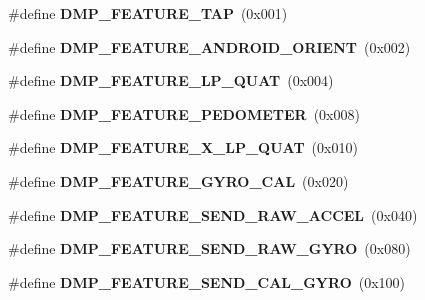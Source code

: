 \begin{DoxyCompactItemize}
\item 
\#define {\bfseries D\+M\+P\+\_\+\+F\+E\+A\+T\+U\+R\+E\+\_\+\+T\+AP}~(0x001)\hypertarget{group___d_r_i_v_e_r_s_ga87fac39cf95e2c56afdf507a986fa00b}{}\label{group___d_r_i_v_e_r_s_ga87fac39cf95e2c56afdf507a986fa00b}

\item 
\#define {\bfseries D\+M\+P\+\_\+\+F\+E\+A\+T\+U\+R\+E\+\_\+\+A\+N\+D\+R\+O\+I\+D\+\_\+\+O\+R\+I\+E\+NT}~(0x002)\hypertarget{group___d_r_i_v_e_r_s_gaf2b250fc928390d562f7bd80300ce419}{}\label{group___d_r_i_v_e_r_s_gaf2b250fc928390d562f7bd80300ce419}

\item 
\#define {\bfseries D\+M\+P\+\_\+\+F\+E\+A\+T\+U\+R\+E\+\_\+\+L\+P\+\_\+\+Q\+U\+AT}~(0x004)\hypertarget{group___d_r_i_v_e_r_s_gabf442c0477f8f7704a8094519ddfe38e}{}\label{group___d_r_i_v_e_r_s_gabf442c0477f8f7704a8094519ddfe38e}

\item 
\#define {\bfseries D\+M\+P\+\_\+\+F\+E\+A\+T\+U\+R\+E\+\_\+\+P\+E\+D\+O\+M\+E\+T\+ER}~(0x008)\hypertarget{group___d_r_i_v_e_r_s_gabcf6a5bc9703782d711d0c6ba92ade85}{}\label{group___d_r_i_v_e_r_s_gabcf6a5bc9703782d711d0c6ba92ade85}

\item 
\#define {\bfseries D\+M\+P\+\_\+\+F\+E\+A\+T\+U\+R\+E\+\_\+X\+\_\+\+L\+P\+\_\+\+Q\+U\+AT}~(0x010)\hypertarget{group___d_r_i_v_e_r_s_gae879a3c9729f9e1be5e6d7c9211c69c0}{}\label{group___d_r_i_v_e_r_s_gae879a3c9729f9e1be5e6d7c9211c69c0}

\item 
\#define {\bfseries D\+M\+P\+\_\+\+F\+E\+A\+T\+U\+R\+E\+\_\+\+G\+Y\+R\+O\+\_\+\+C\+AL}~(0x020)\hypertarget{group___d_r_i_v_e_r_s_gaaf0ac890c1f83106c08b722f1e865fdb}{}\label{group___d_r_i_v_e_r_s_gaaf0ac890c1f83106c08b722f1e865fdb}

\item 
\#define {\bfseries D\+M\+P\+\_\+\+F\+E\+A\+T\+U\+R\+E\+\_\+\+S\+E\+N\+D\+\_\+\+R\+A\+W\+\_\+\+A\+C\+C\+EL}~(0x040)\hypertarget{group___d_r_i_v_e_r_s_ga9eeb257febe4a305df7ad4cf31dc2755}{}\label{group___d_r_i_v_e_r_s_ga9eeb257febe4a305df7ad4cf31dc2755}

\item 
\#define {\bfseries D\+M\+P\+\_\+\+F\+E\+A\+T\+U\+R\+E\+\_\+\+S\+E\+N\+D\+\_\+\+R\+A\+W\+\_\+\+G\+Y\+RO}~(0x080)\hypertarget{group___d_r_i_v_e_r_s_gaa59d3ed6f0cbc66e99ce637546434b34}{}\label{group___d_r_i_v_e_r_s_gaa59d3ed6f0cbc66e99ce637546434b34}

\item 
\#define {\bfseries D\+M\+P\+\_\+\+F\+E\+A\+T\+U\+R\+E\+\_\+\+S\+E\+N\+D\+\_\+\+C\+A\+L\+\_\+\+G\+Y\+RO}~(0x100)\hypertarget{group___d_r_i_v_e_r_s_ga40462c6fd55b04b2f79723dd737ee795}{}\label{group___d_r_i_v_e_r_s_ga40462c6fd55b04b2f79723dd737ee795}


\end{DoxyCompactItemize}

